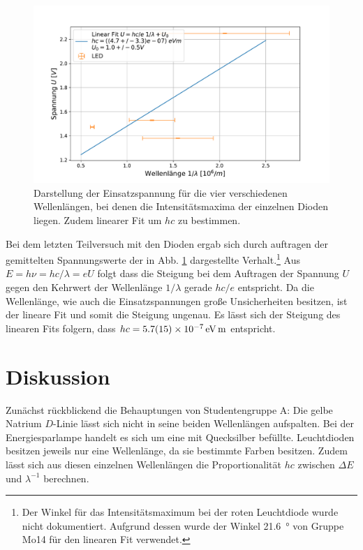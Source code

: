 	\begin{figure}[ht]
		\centering
		\includegraphics[width=\textwidth]{data/Dioden.pdf}
		\caption{Darstellung der Einsatzspannung für die vier verschiedenen Wellenlängen, bei denen die Intensitätsmaxima der einzelnen Dioden liegen. Zudem linearer Fit um $hc$ zu bestimmen.}
		\label{fig:Dioden}	
	\end{figure}
	Bei dem letzten Teilversuch mit den Dioden ergab sich durch auftragen der gemittelten Spannungswerte der in Abb. \ref{fig:Dioden} dargestellte Verhalt.\footnote{Der Winkel für das Intensitätsmaximum bei der roten Leuchtdiode wurde nicht dokumentiert. Aufgrund dessen wurde der Winkel \SI{21,6}{\degree}\cite{Mo14} von Gruppe Mo14 für den linearen Fit verwendet.} 
	Aus $E = h\nu = hc / \lambda = eU$ folgt dass die Steigung bei dem Auftragen der Spannung $U$ gegen den Kehrwert der Wellenlänge $1/\lambda$ gerade $hc / e$ entspricht.
	Da die Wellenlänge, wie auch die Einsatzspannungen große Unsicherheiten besitzen, ist der lineare Fit und somit die Steigung ungenau.
	Es lässt sich der Steigung des linearen Fits folgern, dass $hc = \SI{5,7+-1,5e-7}{\electronvolt\meter}$ entspricht. 
			
\section{Diskussion}
	
	Zunächst rückblickend die Behauptungen von Studentengruppe A: Die gelbe Natrium $D$-Linie lässt sich nicht in seine beiden Wellenlängen aufspalten. Bei der Energiesparlampe handelt es sich um eine mit Quecksilber befüllte. 
	Leuchtdioden besitzen jeweils nur eine Wellenlänge, da sie bestimmte Farben besitzen.
	Zudem lässt sich aus diesen einzelnen Wellenlängen die Proportionalität $hc$ zwischen $\Delta E$ und $\lambda^{-1}$ berechnen.
	
